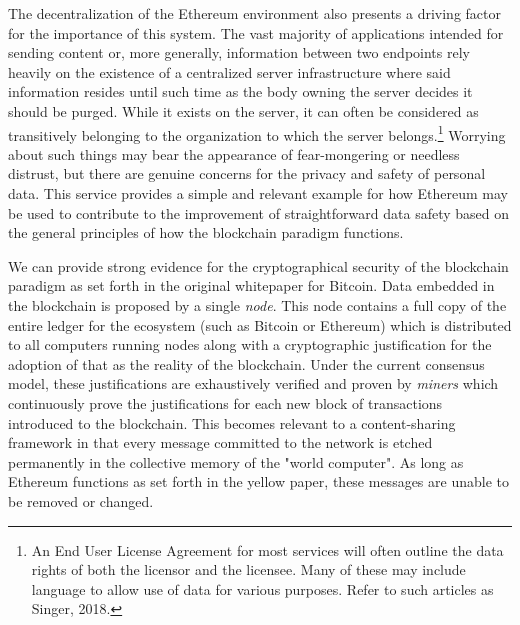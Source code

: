 \documentclass[titlepage]{report}
\begin{document}
The decentralization of the Ethereum environment also presents a driving factor for the importance of this system. The vast majority of applications intended for sending content or, more generally, information between two endpoints rely heavily on the existence of a centralized server infrastructure where said information resides until such time as the body owning the server decides it should be purged. While it exists on the server, it can often be considered as transitively belonging to the organization to which the server belongs.\footnote{An End User License Agreement for most services will often outline the data rights of both the licensor and the licensee. Many of these may include language to allow use of data for various purposes. Refer to such articles as Singer, 2018.\cite{singer}} Worrying about such things may bear the appearance of fear-mongering or needless distrust, but there are genuine concerns for the privacy and safety of personal data. This service provides a simple and relevant example for how Ethereum may be used to contribute to the improvement of straightforward data safety based on the general principles of how the blockchain paradigm functions.

We can provide strong evidence for the cryptographical security of the blockchain paradigm as set forth in the original whitepaper for Bitcoin.\cite{nakamoto} Data embedded in the blockchain is proposed by a single \textit{\gls{node}}. This node contains a full copy of the entire ledger for the ecosystem (such as Bitcoin or Ethereum) which is distributed to all computers running nodes along with a cryptographic justification for the adoption of that as the reality of the blockchain. Under the current consensus model, these justifications are exhaustively verified and proven by \textit{\glspl{miner}} which continuously prove the justifications for each new block of transactions introduced to the blockchain. This becomes relevant to a content-sharing framework in that every message committed to the network is etched permanently in the collective memory of the "world computer". As long as Ethereum functions as set forth in the yellow paper\cite{yellowpaper}, these messages are unable to be removed or changed.
\end{document}
